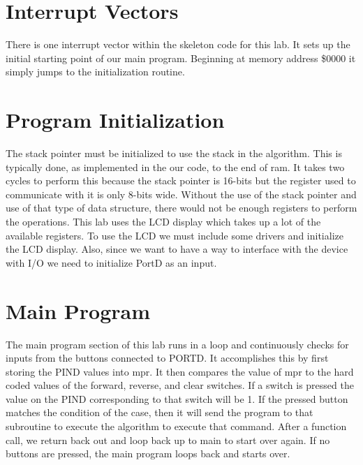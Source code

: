\documentclass[12pt, letterpaper]{article}
\begin{document}
\section{Interrupt Vectors}

There is one interrupt vector within the skeleton code for this lab. It sets up the initial starting point of our main program. Beginning at memory address \$0000 it simply jumps to the initialization routine.

\section{Program Initialization}

The stack pointer must be initialized to use the stack in the algorithm. This is typically done, as implemented in the our code, to the end of ram. It takes two cycles to perform this because the stack pointer is 16-bits but the register used to communicate with it is only 8-bits wide. Without the use of the stack pointer and use of that type of data structure, there would not be enough registers to perform the operations. This lab uses the LCD display which takes up a lot of the available registers. To use the LCD we must include some drivers and initialize the LCD display. Also, since we want to have a way to interface with the device with I/O we need to initialize PortD as an input.




\section{Main Program}

The main program section of this lab runs in a loop and continuously checks for inputs from the buttons connected to PORTD. It accomplishes this by first storing the PIND values into mpr. It then compares the value of mpr to the hard coded values of the forward, reverse, and clear switches. If a switch is pressed the value on the PIND corresponding to that switch will be 1. If the pressed button matches the condition of the case, then it will send the program to that subroutine to execute the algorithm to execute that command. After a function call, we return back out and loop back up to main to start over again. If no buttons are pressed, the main program loops back and starts over.
\end{document}
